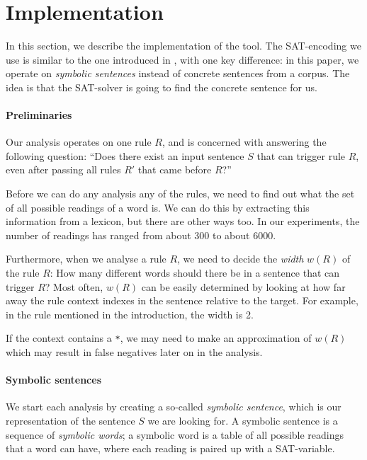 \section{Implementation}
\label{sec:implementation}

In this section, we describe the implementation of the tool.
The SAT-encoding we use is similar to the one introduced in \cite{listenmaa_claessen2015}, with one key difference: in this paper, we operate on {\em symbolic sentences} instead of concrete sentences from a corpus. The idea is that the SAT-solver is going to find the concrete sentence for us.

\paragraph{Preliminaries}

Our analysis operates on one rule $R$, and is concerned with answering the following question: ``Does there exist an input sentence $S$ that can trigger rule $R$, even after passing all rules $R'$ that came before $R$?''

Before we can do any analysis any of the rules, we need to find out what the set of all possible readings of a word is. We can do this by extracting this information from a lexicon, but there are other ways too. In our experiments, the number of readings has ranged from about 300 to about 6000. 

Furthermore, when we analyse a rule $R$, we need to decide the {\em width} $w(R)$ of the rule $R$: How many different words should there be in a sentence that can trigger $R$? Most often, $w(R)$ can be easily determined by looking at how far away the rule context indexes in the sentence relative to the target. For example, in the rule mentioned in the introduction, the width is 2.

If the context contains a \verb!*!, we may need to make an approximation of $w(R)$ which may result in false negatives later on in the analysis.

\paragraph{Symbolic sentences}

We start each analysis by creating a so-called {\em symbolic sentence}, which is our representation of the sentence $S$ we are looking for. A symbolic sentence is a sequence of {\em symbolic words}; a symbolic word is a table of all possible readings that a word can have, where each reading is paired up with a SAT-variable.

